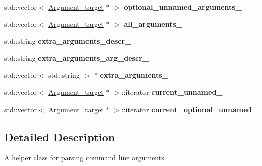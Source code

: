 \begin{DoxyCompactItemize}
\item 
\hypertarget{classdsr_1_1_argument__helper_a8fc0328e0ef7c5c152bad74f271672d9}{
std::vector$<$ \hyperlink{classdsr_1_1_argument__helper_1_1_argument__target}{Argument\_\-target} $\ast$ $>$ {\bfseries optional\_\-unnamed\_\-arguments\_\-}}
\label{classdsr_1_1_argument__helper_a8fc0328e0ef7c5c152bad74f271672d9}

\item 
\hypertarget{classdsr_1_1_argument__helper_a6e4f87d0463bb6357aec49610746a4b6}{
std::vector$<$ \hyperlink{classdsr_1_1_argument__helper_1_1_argument__target}{Argument\_\-target} $\ast$ $>$ {\bfseries all\_\-arguments\_\-}}
\label{classdsr_1_1_argument__helper_a6e4f87d0463bb6357aec49610746a4b6}

\item 
\hypertarget{classdsr_1_1_argument__helper_abd9659f3618de2271033f698502b6a31}{
std::string {\bfseries extra\_\-arguments\_\-descr\_\-}}
\label{classdsr_1_1_argument__helper_abd9659f3618de2271033f698502b6a31}

\item 
\hypertarget{classdsr_1_1_argument__helper_a134e84b82092cfa5dab254ffed9648b1}{
std::string {\bfseries extra\_\-arguments\_\-arg\_\-descr\_\-}}
\label{classdsr_1_1_argument__helper_a134e84b82092cfa5dab254ffed9648b1}

\item 
\hypertarget{classdsr_1_1_argument__helper_af0f1862515857a2fd3516c9eed3b6156}{
std::vector$<$ std::string $>$ $\ast$ {\bfseries extra\_\-arguments\_\-}}
\label{classdsr_1_1_argument__helper_af0f1862515857a2fd3516c9eed3b6156}

\item 
\hypertarget{classdsr_1_1_argument__helper_a3eedb46c02b36e192100f087752275ab}{
std::vector$<$ \hyperlink{classdsr_1_1_argument__helper_1_1_argument__target}{Argument\_\-target} $\ast$ $>$::iterator {\bfseries current\_\-unnamed\_\-}}
\label{classdsr_1_1_argument__helper_a3eedb46c02b36e192100f087752275ab}

\item 
\hypertarget{classdsr_1_1_argument__helper_aa85ba68b391c1db3913a250586fdbac3}{
std::vector$<$ \hyperlink{classdsr_1_1_argument__helper_1_1_argument__target}{Argument\_\-target} $\ast$ $>$::iterator {\bfseries current\_\-optional\_\-unnamed\_\-}}
\label{classdsr_1_1_argument__helper_aa85ba68b391c1db3913a250586fdbac3}

\end{DoxyCompactItemize}


\subsection{Detailed Description}
A helper class for parsing command line arguments. 

